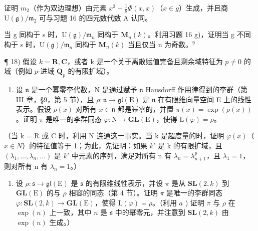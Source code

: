 证明 \(m_{2}\)（作为双边理想）由元素 \(x^{2}-\frac{1}{8}\Phi(x,x)\)（\(x\in g\)）生成，并且商 \(\mathrm{U}(\mathfrak{g})/\mathfrak{m}_{2}\) 可与习题 16 的四元数代数 A 认同。

当 g 同构于 s 时，\(\mathrm{U}(\mathfrak{g})/\mathfrak{m}_{n}\) 同构于 \(\mathbf{M}_{n}(k)\)。利用习题 16 g)，证明当 g 不同构于 s 时，\(\mathrm{U}(\mathfrak{g})/\mathfrak{m}_{n}\) 同构于 \(\mathbf{M}_{n}(k)\) 当且仅当 n 为奇数。\(^{9}\)


¶ 18) 假设 \(k = \mathbf{R}, \mathbf{C}\)，或者 k 是一个关于离散赋值完备且剩余域特征为 \(p \neq 0\) 的域（例如 \(p\)-进域 \(\mathbf{Q}_p\) 的有限扩域）。

\begin{enumerate}
\def\labelenumi{\alph{enumi})}
\tightlist
\item
  设 \(\mathfrak{n}\) 是一个幂零李代数，N 是通过赋予 \(\mathfrak{n}\) Hausdorff 作用律得到的李群（第 III 章，§9，第 5 节），且 \(\rho : \mathfrak{n} \to \mathfrak{gl}(\mathrm{E})\) 是 \(\mathfrak{n}\) 在有限维向量空间 E 上的线性表示。假设 \(\rho(x)\) 对所有 \(x \in \mathfrak{n}\) 都是幂零的，并置 \(\pi(x) = \exp(\rho(x))\)。证明 \(\pi\) 是唯一的李群同态 \(\varphi : \mathrm{N} \to \mathbf{GL}(\mathrm{E})\)，使得 \(\mathrm{L}(\varphi) = \rho\)。
\end{enumerate}

（当 k = R 或 C 时，利用 N 连通这一事实。当 k 是超度量的时，证明 \(\varphi(x)\)（\(x \in N\)）的特征值等于 1；为此，先证明：如果 \(k'\) 是 k 的有限扩域，且 \((\lambda_{1}, \ldots, \lambda_{n}, \ldots)\) 是 \(k'\) 中元素的序列，满足对所有 n 有 \(\lambda_{n} = \lambda_{n+1}^{p}\)，且 \(\lambda_{1} = 1\)，则对所有 n 有 \(\lambda_{n} = 1\)。）

\begin{enumerate}
\def\labelenumi{\alph{enumi})}
\setcounter{enumi}{1}
\tightlist
\item
  设 \(\rho : \mathfrak{s} \to \mathfrak{gl}(\mathrm{E})\) 是 \(\mathfrak{s}\) 的有限维线性表示，并设 \(\pi\) 是从 \(\mathbf{SL}(2, k)\) 到 \(\mathbf{GL}(\mathrm{E})\) 的与 \(\rho\) 相容的同态（第 4 节）。证明 \(\pi\) 是唯一的李群同态 \(\varphi : \mathbf{SL}(2, k) \to \mathbf{GL}(\mathrm{E})\)，使得 \(\mathrm{L}(\varphi) = \rho\)。（利用 \(a\) ) 证明 \(\pi\) 与 \(\rho\) 在 \(\exp(n)\) 上一致，其中 \(n\) 是 \(\mathfrak{s}\) 中的幂零元，并注意到 \(\mathbf{SL}(2, k)\) 由 \(\exp(n)\) 生成。）
\end{enumerate}

